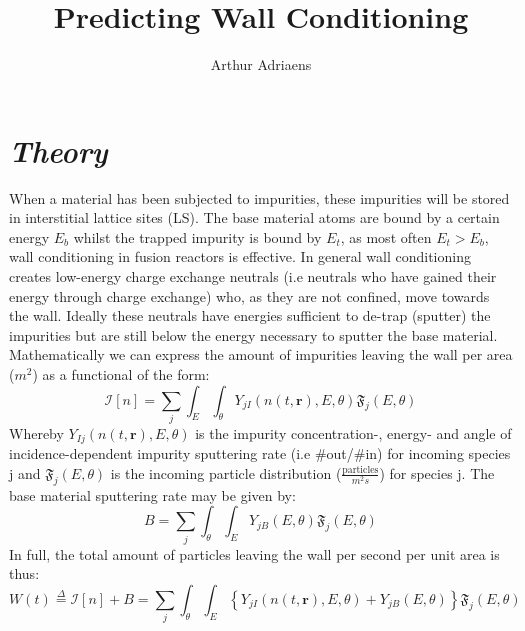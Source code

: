 \documentclass{article}
\title{Predicting Wall Conditioning}
\author{Arthur Adriaens}
\begin{document}
\maketitle
\section*{\textit{Theory}}
When a material has been subjected to impurities, these impurities will be
stored in interstitial lattice sites  (LS). The base material atoms are bound
by a certain energy $E_b$ whilst the trapped impurity is bound by $E_t$, as
most often $E_t>E_b$, wall conditioning in fusion reactors is effective.  In
general wall conditioning creates low-energy charge exchange neutrals (i.e
neutrals who have gained their energy through charge exchange) who, as they are
not confined, move towards the wall. Ideally these neutrals have energies
sufficient to de-trap (sputter) the impurities but are still below the energy
necessary to sputter the base material.  Mathematically we can express the
amount of impurities leaving the wall per area ($m^2$) as a functional of the form:
\begin{equation}
    \mathcal{I}[n] = \sum_j\int_E \int_\theta Y_{jI}(n(t,\mathbf{r}),E,\theta)\mathfrak{F}_j(E,\theta)
\end{equation}
Whereby $Y_{Ij}(n(t,\mathbf{r}),E,\theta)$ is the impurity concentration-, energy- and
angle of incidence-dependent impurity sputtering rate (i.e \#out/\#in) for
incoming species j and $\mathfrak{F}_j(E,\theta)$ is the incoming particle
distribution ($\frac{\text{particles}}{m^2s}$) for species j.  The base
material sputtering rate may be given by:
\begin{equation}
    B = \sum_j\int_\theta \int_E Y_{jB}(E,\theta)\mathfrak{F}_j(E,\theta)
\end{equation}
In full, the total amount of particles leaving the wall per second per unit area
is thus:
\begin{equation}
    W(t) \stackrel{\Delta}{=} \mathcal{I}[n] + B = \sum_j \int_\theta \int_E \left\{ Y_{jI}(n(t,\mathbf{r}),E,\theta) + Y_{jB}(E,\theta) \right\} \mathfrak{F}_j(E,\theta)
\end{equation}
\newpage
\end{document}
